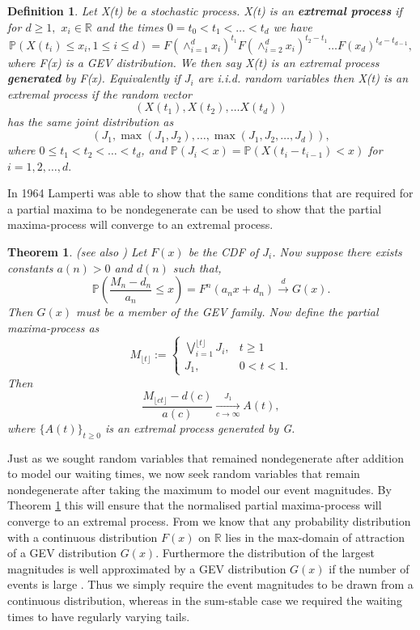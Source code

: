 \documentclass[honours,12pt,twoside, openright]{unswthesis}
\newcommand{\R}{\mathbb{R}}
\newcommand{\PP}{\mathbb{P}}
\newcommand{\1}{\mathbf 1}
\newcommand{\Floor}[1]{{\lfloor {#1} \rfloor}}
\newcommand{\cd}{\overset{d}{\longrightarrow}}
\newtheorem{theorem}[equation]{Theorem}
\newtheorem{definition}[equation]{Definition}
\numberwithin{equation}{section}
\theoremstyle{definition}
\theoremstyle{remark}
\begin{document}
\begin{definition}
	Let X(t) be a stochastic process. X(t) is an \textbf{extremal process} if for $d\geq1,$ $x_i\in\R$ and the times $0=t_0<t_1<\ldots<t_d$ we have
	\[
	\PP(X(t_i)\leq x_i,1\leq i \leq d) = F(\wedge_{i=1}^d x_i)^{t_1} F(\wedge_{i=2}^d x_i)^{t_2-t_1}\ldots F(x_d)^{t_d-t_{d-1}},
	\]
	where F(x) is a GEV distribution. We then say X(t) is an extremal process \textbf{generated} by F(x). Equivalently if $J_i$ are i.i.d. random variables then X(t) is an extremal process if the random vector
	\[
		\left( X(t_1), X(t_2), \ldots X(t_d)\right)
	\]
	has the same joint distribution as 
	\[
		\left(J_1, \max(J_1,J_2), \ldots, \max(J_1,J_2,\ldots,J_d) \right),
	\]
	where $0\leq t_1<t_2<\ldots<t_d$, and $\PP(J_i<x)=\PP(X(t_i-t_{i-1})<x)$ for $i=1,2,\ldots,d.$\\
\end{definition}
\noindent In 1964 Lamperti \cite{Lamperti1964} was able to show that the same conditions that are required for a partial maxima to be nondegenerate can be used to show that the partial maxima-process will converge to an extremal process.\\
\begin{theorem}\cite[Th~3.2]{Lamperti1964}\label{th:extclt} (see also \cite[Th~2]{Resnick1974})
Let $F(x)$ be the CDF of $J_i$. Now suppose there exists constants $a(n)>0$ and $d(n)$ such that,
\[
	\PP\left(\frac{M_n -d_n}{a_n} \leq x \right)=F^n\left(a_nx+d_n\right) \cd G(x) .
\]
Then $G(x)$ must be a member of the GEV family. Now define the partial maxima-process as
\[
	M_\Floor{t}:=
	\begin{cases}
	      \bigvee_{i=1}^{\lfloor{t}\rfloor} J_i, &\textrm{$t\geq 1$}\\
	         J_1, &\textrm{$0<t<1.$}
	\end{cases}
\]
Then 
\[
\frac{M_\Floor{ct}-d(c)}{a(c)} \xrightarrow[c\to \infty]{J_1} A(t),
\]
where $\{A(t)\}_{t\geq0}$ is an extremal process generated by G.\\
\end{theorem}
\noindent Just as we sought random variables that remained nondegenerate after addition to model our waiting times, we now seek random variables that remain nondegenerate after taking the maximum to model our event magnitudes. By Theorem \ref{th:extclt} this will ensure that the normalised partial maxima-process will converge to an extremal process. From \cite{beirlant06Book} we know that any probability distribution with a continuous distribution $F(x)$ on $\R$ lies in the max-domain of attraction of a GEV distribution $G(x)$. Furthermore the distribution of the largest magnitudes is well approximated by a GEV distribution $G(x)$ if the number of events is large \cite{ColesBook}. Thus we simply require the event magnitudes to be drawn from a continuous distribution, whereas in the sum-stable case we required the waiting times to have regularly varying tails.
\end{document}
